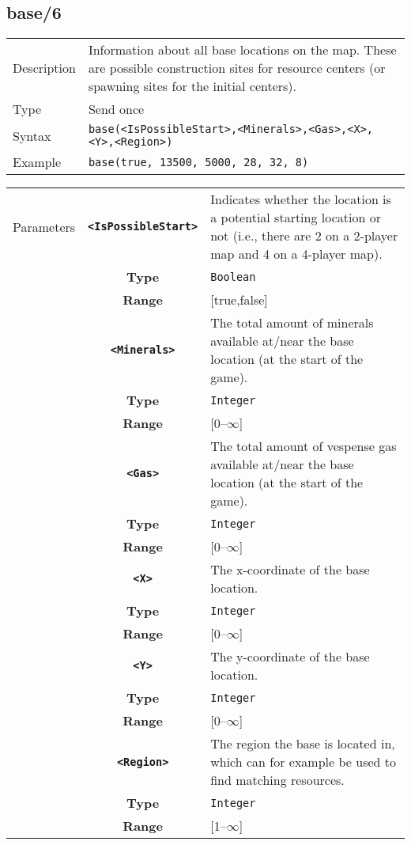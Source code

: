 \subsection{base/6}
\begin{tabularx}{\textwidth}{lX}
 Description & Information about all base locations on the map. These are possible construction sites for resource centers (or spawning sites for the initial centers). \\
 Type & Send once \\
 Syntax & \verb|base(<IsPossibleStart>,<Minerals>,<Gas>,<X>,<Y>,<Region>)| \\
 Example & \verb|base(true, 13500, 5000, 28, 32, 8)| \\
 \end{tabularx}
 \begin{tabularx}{\textwidth}{l | c | p{8cm}|}
 \cline{2-3}
 Parameters & \textbf{\verb|<IsPossibleStart>|} & Indicates whether the location is a potential starting location or not (i.e., there are 2 on a 2-player map and 4 on a 4-player map). \\
            & \textbf{Type} & \verb|Boolean| \\
            & \textbf{Range} & [true,false] \\
            \cline{2-3}
 			& \textbf{\verb|<Minerals>|} & The total amount of minerals available at/near the base location (at the start of the game).\\
            & \textbf{Type} & \verb|Integer| \\
            & \textbf{Range} & [0--$\infty$] \\
            \cline{2-3}
 			& \textbf{\verb|<Gas>|} & The total amount of vespense gas available at/near the base location (at the start of the game).\\
            & \textbf{Type} & \verb|Integer| \\
            & \textbf{Range} & [0--$\infty$] \\
            \cline{2-3}
 			& \textbf{\verb|<X>|} & The x-coordinate of the base location.\\
            & \textbf{Type} & \verb|Integer| \\
            & \textbf{Range} & [0--$\infty$] \\
            \cline{2-3}
            & \textbf{\verb|<Y>|} & The y-coordinate of the base location.\\
            & \textbf{Type} & \verb|Integer| \\
            & \textbf{Range} & [0--$\infty$] \\
            \cline{2-3}
            & \textbf{\verb|<Region>|} & The region the base is located in, which can for example be used to find matching resources. \\
            & \textbf{Type} & \verb|Integer| \\
            & \textbf{Range} & [1--$\infty$] \\
            \cline{2-3}
\end{tabularx}

